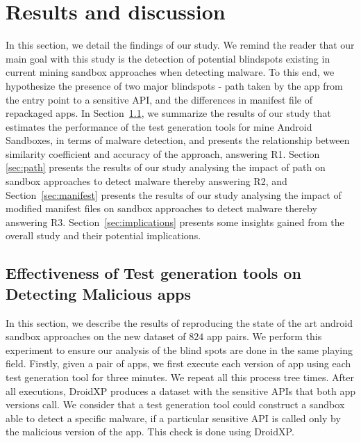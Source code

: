 \section{Results and discussion}\label{sec:results}

In this section, we detail the findings of our study.  We remind the reader that our main goal with this study is the detection of potential blindspots existing in current mining sandbox approaches when detecting malware. To this end, we hypothesize the presence of two major blindspots - path taken by the app from the entry point to a sensitive API, and the differences in manifest file of repackaged apps. In Section~\ref{sec:testGeneration}, we summarize the results of our study that estimates the performance of the test generation tools for mine Android Sandboxes, in terms of malware detection, and presents the relationship between similarity coefficient and accuracy of the approach, answering R1. Section \ref{sec:path} presents the results of our study analysing the impact of path on sandbox approaches to detect malware thereby answering R2, and Section~\ref{sec:manifest} presents the results of our study analysing the impact of modified manifest files on sandbox approaches to detect malware thereby answering R3. Section~\ref{sec:implications} presents some insights gained from the overall study and their potential implications.

\subsection{Effectiveness of Test generation tools on Detecting Malicious apps}\label{sec:testGeneration}


In this section, we describe the results of reproducing the state of the art android sandbox approaches on the new dataset of $824$ app pairs. We perform this experiment to ensure our analysis of the blind spots are done in the same playing field. 
Firstly, given a pair of apps, we first execute each version of app using each test generation tool for three minutes. We repeat all this process tree times. After all executions, DroidXP produces a dataset with the sensitive APIs that both app versions call. We consider that a test generation tool could construct a sandbox able to detect a specific malware, if a particular sensitive API is called only by the malicious version of the app. This check is done using DroidXP. 

